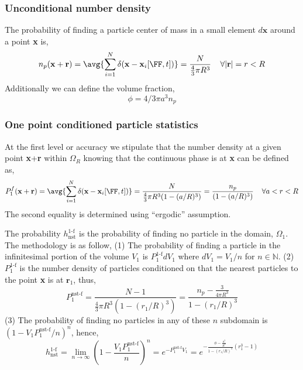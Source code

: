 \subsubsection{Unconditional number density}
The probability of finding a particle center of mass in a small element $d\textbf{x}$ around a point \textbf{x} is, 
\begin{equation}
    n_p(\textbf{x}+ \textbf{r})
    = \avg{\sum_{i=1}^N \delta(\textbf{x}-\textbf{x}_i[\FF,t])}
    =
    \frac{N}{\frac{4}{3}\pi R^3}
    \;\;\;\; \forall |\textbf{r}| = r < R  
\end{equation}
Additionally we can define the volume fraction, 
\begin{equation}
    \phi = 4/3 \pi a^3 n_p
\end{equation}
\subsubsection{One point conditioned particle statistics}

At the first level or accuracy we stipulate that the number density at a given point \textbf{x}+\textbf{r} within $\Omega_R$ knowing that the continuous phase is at \textbf{x} can be defined as, 
\begin{equation}
    P_\text{1}^f(\textbf{x}+ \textbf{r})
    = \avg{\sum_{i=1}^N \delta(\textbf{x}-\textbf{x}_i[\FF,t])}
    =
    \frac{N}{\frac{4}{3}\pi R^3 (1 - (a/R)^3)}
    =
    \frac{n_p}{ (1 - (a/R)^3)}
    \;\;\;\; \forall a< r < R   
\end{equation}
The second equality is determined using ``ergodic'' assumption. 

The probability $h^\text{1-f}_\text{nst}$ is the probability of finding no particle in the domain, $\Omega_1$. 
The methodology is  as follow,
(1) The probability of finding a particle in the infinitesimal portion of the volume $V_1$ is $P^\text{1-f}_1 dV_1$ where $dV_1 = V_1 / n$ for $n\in \mathbb{N}$. 
(2) $P^\text{1-f}_1$ is the number density of particles conditioned on that the nearest particles to the point \textbf{x} is at $\textbf{r}_1$, thus, 
\begin{equation}
    P^\text{nst-f}_1
    =
    \frac{N - 1}{\frac{4}{3}\pi R^3 (1 - (r_1/R)^3)}
    = 
     \frac{n_p - \frac{3}{4 \pi R^3}}{1 - (r_1/R)^3}
\end{equation} 
(3) The probability of finding no particles in any of these $n$ subdomain is $(1 - V_1 P^\text{nst-f}_1 /n)^n$, hence, 
\begin{equation}
    h^\text{1-f}_\text{nst}
    =
    \lim_{n\to\infty}
    (1 - \frac{V_1 P^\text{nst-f}_1}{n})^n
    =
    e^{-P^\text{nst-f}_1 V_1 }
    =
    e^{- \frac{\phi - \frac{a^3}{ R^3}}{1 - (r_1/R)^3}  (r_1^3 - 1) }
\end{equation}


